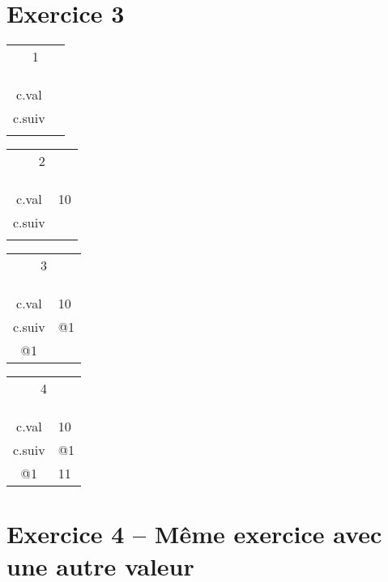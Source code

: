 \section{Exercice 3}

\begin{tabular}{c|p{1cm}}
	\multicolumn{2}{c|}{1}\\
	&\\
	\hline
	&\\	
	\hline
	&\\
	\hline
	c.val &\\
	\hline
	c.suiv & \\
	\hline
	&\\	
	\hline
\end{tabular}
\begin{tabular}{c|p{1cm}}
	\multicolumn{2}{c|}{2}\\
	&\\
	\hline
	&\\	
	\hline
	&\\
	\hline
	c.val & 10\\
	\hline
	c.suiv & \\
	\hline
	&\\	
	\hline
\end{tabular}
\begin{tabular}{c|p{1cm}}
	\multicolumn{2}{c|}{3}\\
	&\\
	\hline
	&\\	
	\hline
	&\\
	\hline
	c.val & 10\\
	\hline
	c.suiv & @1\\
	\hline
	@1&\\	
	\hline
\end{tabular}
\begin{tabular}{c|p{1cm}}
	\multicolumn{2}{c|}{4}\\
	&\\
	\hline
	&\\	
	\hline
	&\\
	\hline
	c.val & 10\\
	\hline
	c.suiv & @1\\
	\hline
	@1&11\\	
	\hline
\end{tabular}

\section{Exercice 4 -- Même exercice avec une autre valeur}

